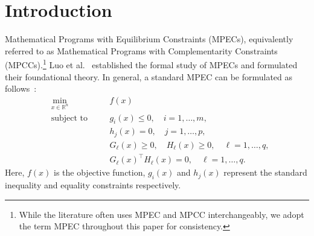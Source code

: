 \section{Introduction}
\label{sec:intro}


Mathematical Programs with Equilibrium Constraints
(MPECs), equivalently referred to as Mathematical Programs with Complementarity Constraints (MPCCs).\footnote{While the literature often uses MPEC and MPCC interchangeably, we adopt the term MPEC throughout this paper for consistency.} %
Luo et al.~\cite{LuoPangRalph1996} established the formal
study of MPECs and formulated their foundational theory.
In general, a standard MPEC can be formulated as follows~\cite{Ye2005}:
\begin{equation}
\begin{aligned}
  &\min_{x \in \mathbb{R}^n} \quad && f(x) \\
  &\text{subject to} \quad && g_i(x) \leq 0, \quad i = 1, \ldots, m, \\
  & && h_j(x) = 0, \quad j = 1, \ldots, p, \\
  & && G_\ell(x) \geq 0, \quad H_\ell(x) \geq 0, \quad \ell = 1, \ldots, q, \\
  & && G_\ell(x)^{\top} H_\ell(x) = 0, \quad \ell = 1, \ldots, q.
\end{aligned}
\label{eq:general_mpec}
\end{equation}
Here, $f(x)$ is the objective function, $g_i(x)$ and $h_j(x)$ represent
the standard inequality and equality constraints respectively.

